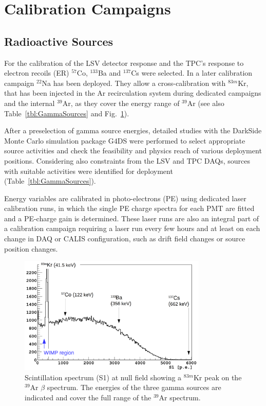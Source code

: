 \section{Calibration Campaigns}\label{sec:CalibCampaigns}
\subsection{Radioactive Sources}
For the calibration of the LSV detector response and the TPC's response to electron recoils (ER) $^{57}$Co, $^{133}$Ba and $^{137}$Cs were selected. In a later calibration campaign $^{22}$Na has been deployed. They allow a cross-calibration with $^{83m}$Kr, that has been injected in the Ar recirculation system during dedicated campaigns and the internal $^{39}$Ar, as they cover the energy range of $^{39}$Ar (see also Table~\ref{tbl:GammaSources} and Fig.~\ref{fig:GammaSources_Ar39spectrum}). %

After a preselection of gamma source energies, detailed studies with the DarkSide Monte Carlo simulation package G4DS \cite{DS50:G4DS:paper} were performed to select appropriate source activities and check the feasibility and physics reach of various deployment positions. Considering also constraints from the LSV and TPC DAQs, sources with suitable activities were identified for deployment (Table~\ref{tbl:GammaSources}).

Energy variables are calibrated in photo-electrons (PE) using dedicated laser calibration runs, in which the single PE charge spectra for each PMT are fitted and a PE-charge gain is determined. 
These laser runs are also an integral part of a calibration campaign requiring a laser run every few hours and at least on each change in DAQ or CALIS configuration, such as drift field changes or source position changes.

\begin{figure}[htbp]
 \centering
 \includegraphics[width=0.8\textwidth]{Figures/GammaSources_Ar39spectrum.png}
 \caption{Scintillation spectrum (S1) at null field showing a $^{83m}$Kr peak on the $^{39}$Ar $\beta$ spectrum. The energies of the three gamma sources are indicated and cover the full range of the $^{39}$Ar spectrum.
\label{fig:GammaSources_Ar39spectrum}}
\end{figure}

